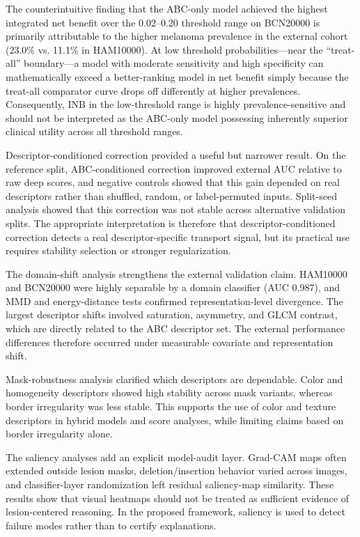 \documentclass[preprint,12pt]{elsarticle}
\begin{document}
The counterintuitive finding that the ABC-only model achieved the highest integrated net benefit over the 0.02--0.20 threshold range on BCN20000 is primarily attributable to the higher melanoma prevalence in the external cohort (23.0\% vs. 11.1\% in HAM10000). At low threshold probabilities---near the ``treat-all'' boundary---a model with moderate sensitivity and high specificity can mathematically exceed a better-ranking model in net benefit simply because the treat-all comparator curve drops off differently at higher prevalences. Consequently, INB in the low-threshold range is highly prevalence-sensitive and should not be interpreted as the ABC-only model possessing inherently superior clinical utility across all threshold ranges.

Descriptor-conditioned correction provided a useful but narrower result. On the reference split, ABC-conditioned correction improved external AUC relative to raw deep scores, and negative controls showed that this gain depended on real descriptors rather than shuffled, random, or label-permuted inputs. Split-seed analysis showed that this correction was not stable across alternative validation splits. The appropriate interpretation is therefore that descriptor-conditioned correction detects a real descriptor-specific transport signal, but its practical use requires stability selection or stronger regularization.

The domain-shift analysis strengthens the external validation claim. HAM10000 and BCN20000 were highly separable by a domain classifier (AUC 0.987), and MMD and energy-distance tests confirmed representation-level divergence. The largest descriptor shifts involved saturation, asymmetry, and GLCM contrast, which are directly related to the ABC descriptor set. The external performance differences therefore occurred under measurable covariate and representation shift.

Mask-robustness analysis clarified which descriptors are dependable. Color and homogeneity descriptors showed high stability across mask variants, whereas border irregularity was less stable. This supports the use of color and texture descriptors in hybrid models and score analyses, while limiting claims based on border irregularity alone.

The saliency analyses add an explicit model-audit layer. Grad-CAM maps often extended outside lesion masks, deletion/insertion behavior varied across images, and classifier-layer randomization left residual saliency-map similarity. These results show that visual heatmaps should not be treated as sufficient evidence of lesion-centered reasoning. In the proposed framework, saliency is used to detect failure modes rather than to certify explanations.
\end{document}
